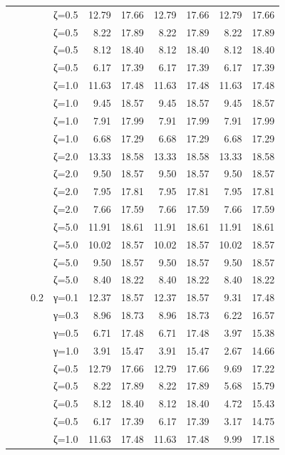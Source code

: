 \begin{table}[htbp]
\begin{tabular}{ll r l  rr  rr  rr}
  &  &  & ζ=0.5 & 12.79 & 17.66 & 12.79 & 17.66 & 12.79 & 17.66 \\
  &  &  & ζ=0.5 & 8.22 & 17.89 & 8.22 & 17.89 & 8.22 & 17.89 \\
  &  &  & ζ=0.5 & 8.12 & 18.40 & 8.12 & 18.40 & 8.12 & 18.40 \\
  &  &  & ζ=0.5 & 6.17 & 17.39 & 6.17 & 17.39 & 6.17 & 17.39 \\
  &  &  & ζ=1.0 & 11.63 & 17.48 & 11.63 & 17.48 & 11.63 & 17.48 \\
  &  &  & ζ=1.0 & 9.45 & 18.57 & 9.45 & 18.57 & 9.45 & 18.57 \\
  &  &  & ζ=1.0 & 7.91 & 17.99 & 7.91 & 17.99 & 7.91 & 17.99 \\
  &  &  & ζ=1.0 & 6.68 & 17.29 & 6.68 & 17.29 & 6.68 & 17.29 \\
  &  &  & ζ=2.0 & 13.33 & 18.58 & 13.33 & 18.58 & 13.33 & 18.58 \\
  &  &  & ζ=2.0 & 9.50 & 18.57 & 9.50 & 18.57 & 9.50 & 18.57 \\
  &  &  & ζ=2.0 & 7.95 & 17.81 & 7.95 & 17.81 & 7.95 & 17.81 \\
  &  &  & ζ=2.0 & 7.66 & 17.59 & 7.66 & 17.59 & 7.66 & 17.59 \\
  &  &  & ζ=5.0 & 11.91 & 18.61 & 11.91 & 18.61 & 11.91 & 18.61 \\
  &  &  & ζ=5.0 & 10.02 & 18.57 & 10.02 & 18.57 & 10.02 & 18.57 \\
  &  &  & ζ=5.0 & 9.50 & 18.57 & 9.50 & 18.57 & 9.50 & 18.57 \\
  &  &  & ζ=5.0 & 8.40 & 18.22 & 8.40 & 18.22 & 8.40 & 18.22 \\
  &  & 0.2 & γ=0.1 & 12.37 & 18.57 & 12.37 & 18.57 & 9.31 & 17.48 \\
  &  &  & γ=0.3 & 8.96 & 18.73 & 8.96 & 18.73 & 6.22 & 16.57 \\
  &  &  & γ=0.5 & 6.71 & 17.48 & 6.71 & 17.48 & 3.97 & 15.38 \\
  &  &  & γ=1.0 & 3.91 & 15.47 & 3.91 & 15.47 & 2.67 & 14.66 \\
  &  &  & ζ=0.5 & 12.79 & 17.66 & 12.79 & 17.66 & 9.69 & 17.22 \\
  &  &  & ζ=0.5 & 8.22 & 17.89 & 8.22 & 17.89 & 5.68 & 15.79 \\
  &  &  & ζ=0.5 & 8.12 & 18.40 & 8.12 & 18.40 & 4.72 & 15.43 \\
  &  &  & ζ=0.5 & 6.17 & 17.39 & 6.17 & 17.39 & 3.17 & 14.75 \\
  &  &  & ζ=1.0 & 11.63 & 17.48 & 11.63 & 17.48 & 9.99 & 17.18 \\

\end{tabular}
\end{table}
